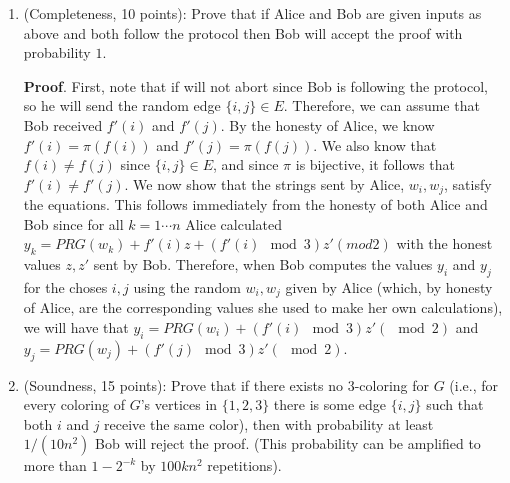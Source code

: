 \documentclass{article}
\begin{document}
\begin{enumerate}[noitemsep,topsep=\mdcompacttopsep,label=\alph*.]%

\item{}(Completeness, 10 points): Prove that if Alice and Bob are given inputs as above and both follow the protocol then Bob will accept the proof with probability $1$.

\begin{mdbmarginx}{1ex}{0pt}{1ex}{0pt}%
\noindent{}\textbf{Proof}.  First, note that if will not abort since Bob is following the protocol, so he will send the random edge 
$\{i,j\} \in E$. Therefore, we can assume that Bob received $f'(i)$ and $f'(j)$. By the honesty of 
Alice, we know $f'(i) = \pi(f(i))$ and $f'(j) = \pi(f(j))$. We also know that $f(i) \neq f(j)$ since
$\{i,j\} \in E$, and since $\pi$ is bijective, it follows that $f'(i) \neq f'(j)$. We now show that
the strings sent by Alice, $w_i,w_j$, satisfy the equations. This follows immediately from the 
honesty of both Alice and Bob since for all $k = 1\cdots n$ Alice calculated 
$y_k = PRG(w_k) + f'(i)z + (f'(i) \mod 3)z'( mod 2)$ with the honest values $z,z'$ sent by Bob. Therefore,
when Bob computes the values $y_i$ and $y_j$ for the choses $i,j$ using the random $w_i,w_j$ given by
Alice (which, by honesty of Alice, are the corresponding values she used to make her own calculations),
we will have that $y_i = PRG(w_i) + (f'(i) \mod 3)z'( \mod 2)$ and $y_j = PRG(w_j) + (f'(j)\mod 3)z'(\mod 2)$. 
\mdfloatright{\ensuremath{\Box}}%
\end{mdbmarginx}%

\item{}(Soundness, 15 points): Prove that if there exists no 3-coloring for $G$ (i.e., for every coloring of $G$'s vertices in $\{1,2,3\}$ there is some edge $\{i,j\}$ such that both $i$ and $j$ receive the same color), then with probability at least $1/(10n^2)$ Bob  will reject the proof. (This probability can be amplified to more than $1-2^{-k}$ by $100kn^2$ repetitions).


\end{enumerate}
\end{document}

